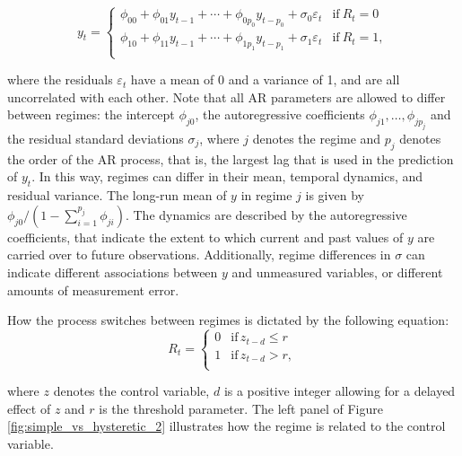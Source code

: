 \documentclass{article}
\begin{document}
\begin{equation}
y_t = 
\begin{cases}
\phi_{00} + \phi_{01} y_{t-1} + \cdots + \phi_{0 p_0} y_{t-p_0} + \sigma_{0} \varepsilon_t & \text{if}~R_{t} = 0\\
\phi_{10} + \phi_{11} y_{t-1} + \cdots + \phi_{1 p_1} y_{t-p_1} + \sigma_{1} \varepsilon_t & \text{if}~R_{t} = 1, \\
\end{cases}
\label{eqn:ar_processes}
\end{equation}

where the residuals $\varepsilon_t$ have a mean of 0 and a variance of 1, and are all uncorrelated with each other.
Note that all AR parameters are allowed to differ between regimes: the intercept $\phi_{j0}$, the autoregressive coefficients $\phi_{j1}, \dots, \phi_{j p_j}$ and the residual standard deviations $\sigma_j$, where $j$ denotes the regime and $p_j$ denotes the order of the AR process, that is, the largest lag that is used in the prediction of $y_t$.
In this way, regimes can differ in their mean, temporal dynamics, and residual variance.
The long-run mean of $y$ in regime $j$ is given by $\phi_{j0}/(1 - \sum_{i=1}^{p_j} \phi_{ji})$. 
The dynamics are described by the autoregressive coefficients, that indicate the extent to which current and past values of $y$ are carried over to future observations.
Additionally, regime differences in $\sigma$ can indicate different associations between $y$ and unmeasured variables, or different amounts of measurement error.

How the process switches between regimes is dictated by the following equation:
\begin{equation} \label{eqn:simple_switching}
R_t = \begin{cases}
0 & \mathrm{if} \, z_{t-d} \le r \\
1 & \mathrm{if} \, z_{t-d} > r, \\
\end{cases}
\end{equation}

where $z$ denotes the control variable, $d$ is a positive integer allowing for a delayed effect of $z$ and $r$ is the threshold parameter. The left panel of Figure \ref{fig:simple_vs_hysteretic_2} illustrates how the regime is related to the control variable.
\end{document}
